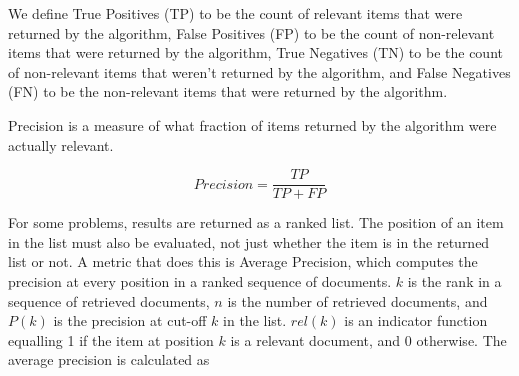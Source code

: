 We define True Positives (TP) to be the count of relevant items that were returned by the algorithm, False Positives (FP) to be the count of non-relevant items that were returned by the algorithm, True Negatives (TN) to be the count of non-relevant items that weren't returned by the algorithm, and False Negatives (FN) to be the non-relevant items that were returned by the algorithm.

Precision is a measure of what fraction of items returned by the algorithm were actually relevant.

\[
Precision = \frac {TP} {TP + FP}
\]

For some problems, results are returned as a ranked list. The position of an item in the list must also be evaluated, not just whether the item is in the returned list or not. A metric that does this is Average Precision, which computes the precision at every position in a ranked sequence of documents. $k$ is the rank in a sequence of retrieved documents, $n$ is the number of retrieved documents, and $P(k)$ is the precision at cut-off $k$ in the list. $rel(k)$ is an indicator function equalling 1 if the item at position $k$ is a relevant document, and 0 otherwise. The average precision is calculated as

